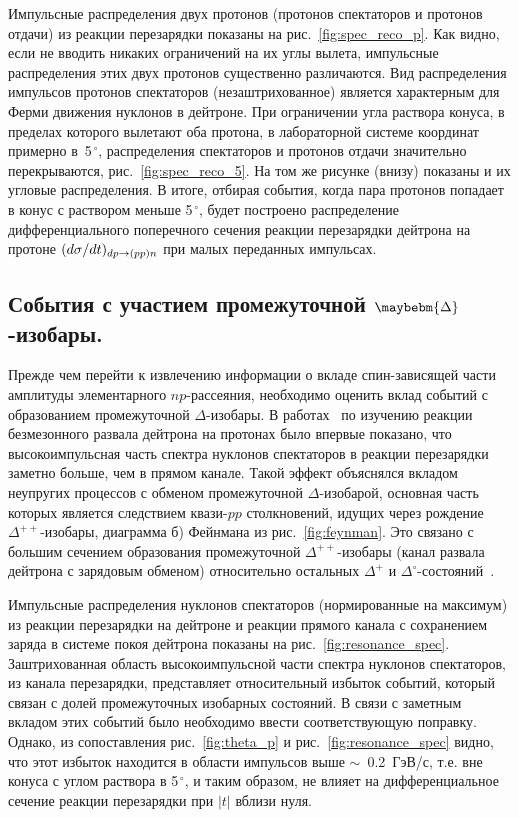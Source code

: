 Импульсные распределения двух протонов (протонов спектаторов и протонов отдачи)
из реакции перезарядки \dpchex показаны на рис.~\ref{fig:spec_reco_p}. Как
видно, если не вводить никаких ограничений на их углы вылета, импульсные
распределения этих двух протонов существенно различаются. Вид распределения
импульсов протонов спектаторов (незаштрихованное) является характерным для Ферми
движения нуклонов в дейтроне. При ограничении угла раствора конуса, в пределах
которого вылетают оба протона, в лабораторной системе координат примерно
в~5$^{\,\circ}$, распределения спектаторов и протонов отдачи значительно
перекрываются, рис.~\ref{fig:spec_reco_5}. На том же рисунке (внизу) показаны и
их угловые распределения. В итоге, отбирая события, когда пара протонов попадает
в конус с раствором меньше 5$^{\,\circ}$, будет построено распределение
дифференциального поперечного сечения реакции перезарядки дейтрона на протоне
$(d\sigma/dt)_{dp \rightarrow (pp)n}$ при малых переданных импульсах.

\subsection{События с участием промежуточной
  $\maybebm{\Delta}$-изобары.}
Прежде чем перейти к извлечению информации о вкладе спин-зависящей части
амплитуды элементарного $np$-рассеяния, необходимо оценить вклад событий с
образованием промежуточной $\Delta$-изобары. В
работах~\cite{alad75_2,alad76,alad79}
по изучению реакции безмезонного развала дейтрона на протонах было впервые
показано, что высокоимпульсная часть спектра нуклонов спектаторов в реакции
перезарядки заметно больше, чем в прямом канале. Такой эффект объяснялся вкладом
неупругих процессов с обменом промежуточной $\Delta$-изобарой, основная часть
которых является следствием квази-$pp$ столкновений, идущих через рождение
$\Delta^{++}$-изобары, диаграмма б) Фейнмана из рис.~\ref{fig:feynman}. Это
связано с большим сечением образования промежуточной $\Delta^{++}$-изобары
(канал развала дейтрона с зарядовым обменом) относительно остальных $\Delta^{+}$
и $\Delta^{\circ}$-состояний~\cite{dol86}.


Импульсные распределения нуклонов спектаторов (нормированные на максимум) из
реакции перезарядки на дейтроне \dpchex и реакции прямого канала с сохранением
заряда \dpret в системе покоя дейтрона показаны на
рис.~\ref{fig:resonance_spec}. Заштрихованная область высокоимпульсной части
спектра нуклонов спектаторов, из канала перезарядки, представляет относительный
избыток событий, который связан с долей промежуточных изобарных состояний. В
связи с заметным вкладом этих событий было необходимо ввести соответствующую
поправку. Однако, из сопоставления рис.~\ref{fig:theta_p} и
рис.~\ref{fig:resonance_spec} видно, что этот избыток находится в области
импульсов выше $\sim$~0.2~ГэВ/с, т.е. вне конуса с углом раствора в
5$^{\,\circ}$, и таким образом, не влияет на дифференциальное сечение реакции
перезарядки при $|t|$ вблизи нуля.

